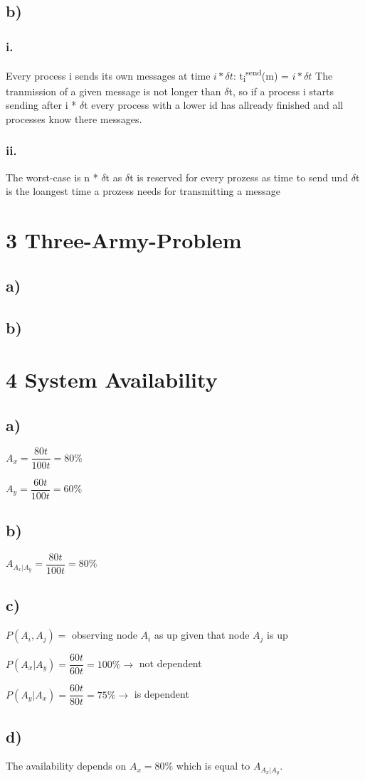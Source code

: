 \documentclass{scrartcl}
\begin{document}
\subsection*{b)}
\subsubsection*{i.}
Every process i sends its own messages at time $ i * \delta t$:
t\textsubscript{i}\textsuperscript{send}(m) = $ i * \delta t $
The tranmission of a given message is not longer than $ \delta $t, so if a process i starts sending after i * $ \delta $t every process with a lower id has allready finished and all processes know there messages.
\subsubsection*{ii.}
The worst-case is n * $ \delta $t as $ \delta $t is reserved for every prozess as time to send und $ \delta $t is the loangest time a prozess needs for transmitting a message


\section*{3 Three-Army-Problem}
\subsection*{a)}
\subsection*{b)}

\section*{4 System Availability}
\subsection*{a)}
$ A_x = \dfrac{80t}{100t} = 80\% $

$ A_y = \dfrac{60t}{100t} = 60\%$
\subsection*{b)}

$ A_{A_x|A_y} = \dfrac{80t}{100t} = 80\% $
\subsection*{c)}
$ P(A_i, A_j) = $ observing node $ A_i $ as up given that node $ A_j $ is up

$ P(A_x|A_y) = \dfrac{60t}{60t} = 100\% \rightarrow$ not dependent

$ P(A_y|A_x) = \dfrac{60t}{80t} = 75\% \rightarrow$ is dependent
\subsection*{d)}
The availability depends on $ A_x = 80\% $ which is equal to $ A_{A_x|A_y} $.
\end{document}
